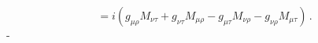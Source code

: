 \begin{equation} [M_{\mu\nu},
M_{\rho\tau}] = i(g_{\mu\rho}M_{\nu\tau}+
g_{\nu\tau}M_{\mu\rho}-g_{\mu\tau}M_{\nu\rho}
-g_{\nu\rho}M_{\mu\tau})\, .\label{r21}\end{equation}-
